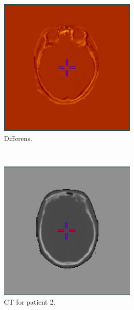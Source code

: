\begin{figure}
\begin{subfigure}[b]{0.3\textwidth}
        \centering
        \includegraphics[width=0.75\textwidth]{colager/loocv_ct/loocv_010476_sub.png}
        \caption{Differens.}
        \label{col:loocv_ct_pat1_sub}
    \end{subfigure}\\
    \begin{subfigure}[b]{0.3\textwidth}
        \centering
        \includegraphics[width=0.75\textwidth]{colager/loocv_ct/loocv_010769_ct.png}
        \caption{CT for patient 2.}
        \label{col:loocv_ct_pat2_ct}
    \end{subfigure}\hfill
    \begin{subfigure}[b]{0.3\textwidth}
        \centering

\end{subfigure}
\end{figure}
